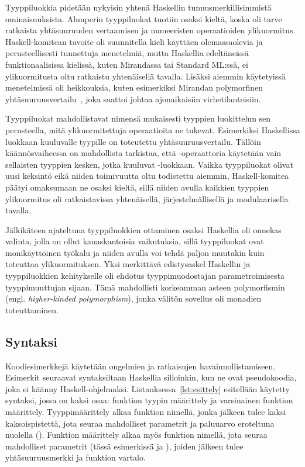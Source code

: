\documentclass[finnish]{tktltiki2}
\begin{document}
Tyyppiluokkia pidetään nykyisin yhtenä Haskellin tunnusmerkillisimmistä ominaisuuksista. Alunperin
tyyppiluokat tuotiin osaksi kieltä, koska oli tarve ratkaista yhtäsuuruuden vertaamisen ja
numeeristen operaatioiden ylikuormitus. Haskell-komitean tavoite oli suunnitella kieli käyttäen
olemassaolevia ja perusteellisesti tunnettuja menetelmiä, mutta Haskellia edeltäneissä
funktionaalisissa kielissä, kuten Mirandassa tai Standard ML:ssä, ei ylikuormitusta oltu ratkaistu
yhtenäisellä tavalla. Lisäksi aiemmin käytetyissä menetelmissä oli heikkouksia, kuten esimerkiksi
Mirandan polymorfinen yhtäsuuruusvertailu~, joka saattoi johtaa ajonaikaisiin
virhetilanteisiin.

Tyyppiluokat mahdollistavat nimensä mukaisesti tyyppien luokittelun sen perusteella, mitä
ylikuormitettuja operaatioita ne tukevat. Esimerkiksi Haskellissa luokkaan  kuuluvalle
tyypille on toteutettu yhtäsuuruusvertailu. Tällöin käännösvaiheessa on mahdollista tarkistaa, että
\code{==}-operaattoria käytetään vain sellaisten tyyppien kesken, jotka kuuluvat
-luokkaan. Vaikka tyyppiluokat olivat uusi keksintö eikä niiden toimivuutta oltu
todistettu aiemmin, Haskell-komitea päätyi omaksumaan ne osaksi kieltä, sillä niiden avulla kaikkien
tyyppien ylikuormitus oli ratkaistavissa yhtenäisellä, järjestelmällisellä ja modulaarisella
tavalla.

Jälkikäteen ajateltuna tyyppiluokkien ottaminen osaksi Haskellia oli onnekas valinta,
jolla on ollut kauaskantoisia vaikutuksia, sillä tyyppiluokat ovat monikäyttöinen työkalu ja niiden
avulla voi tehdä paljon muutakin kuin toteuttaa ylikuormituksen. Yksi merkittävä edistysaskel
Haskellin ja tyyppiluokkien kehitykselle oli ehdotus tyyppimuodostajan parametroimisesta
tyyppimuuttujan sijaan. Tämä mahdollisti korkeamman asteen polymorfismin (engl. \emph{higher-kinded
polymorphism}), jonka välitön sovellus oli monadien toteuttaminen.

\subsection{Syntaksi}

Koodiesimerkkejä käytetään ongelmien ja ratkaisujen havainnollistamiseen. Esimerkit seuraavat
syntaksiltaan Haskellia silloinkin, kun ne ovat pseudokoodia, joka ei käänny Haskell-ohjelmaksi.
Listauksessa~\ref{lst:esittely} esitellään käytetty syntaksi, jossa on kaksi osaa: funktion tyypin
määrittely ja varsinainen funktion määrittely. Tyyppimäärittely alkaa funktion nimellä, jonka
jälkeen tulee kaksi kaksoispistettä, jota seuraa mahdolliset parametrit ja paluuarvo eroteltuna
nuolella (\code{->}). Funktion määrittely alkaa myös funktion nimellä, jota seuraa mahdolliset
parametrit (tässä esimerkissä  ja ), joiden jälkeen tulee yhtäsuuruusmerkki ja
funktion vartalo.
\end{document}
